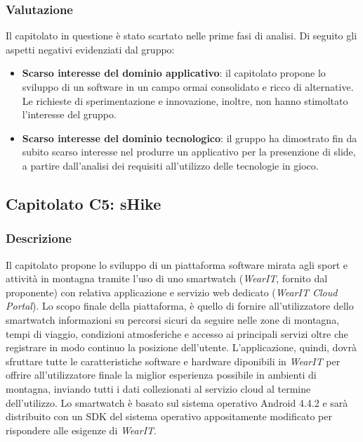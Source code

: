 \subsubsection{Valutazione}
Il capitolato in questione è stato scartato nelle prime fasi di analisi. Di seguito gli aspetti negativi evidenziati dal gruppo:
\begin{itemize}
\item \textbf{Scarso interesse del dominio applicativo}: il capitolato propone lo sviluppo di un software in un campo ormai consolidato e ricco di alternative. Le richieste di sperimentazione e innovazione, inoltre, non hanno stimoltato l'interesse del gruppo.
\item \textbf{Scarso interesse del dominio tecnologico}: il gruppo ha dimostrato fin da subito scarso interesse nel produrre un applicativo per la presenzione di slide, a partire dall'analisi dei requisiti all'utilizzo delle tecnologie in gioco.
\end{itemize}


\subsection{Capitolato C5: sHike}

\subsubsection{Descrizione}
Il capitolato propone lo sviluppo di un piattaforma software mirata agli sport e attività  in montagna tramite l'uso di uno smartwatch (\emph{WearIT}, fornito dal proponente) con relativa applicazione e servizio web dedicato (\emph{WearIT Cloud Portal}). Lo scopo finale della piattaforma, è quello di fornire all'utilizzatore dello smartwatch informazioni su percorsi sicuri da seguire nelle zone di montagna, tempi di viaggio, condizioni atmosferiche e accesso ai principali servizi oltre che registrare in modo continuo la posizione dell'utente. L'applicazione, quindi, dovrà sfruttare tutte le caratteristiche software e hardware diponibili in \emph{WearIT} per offrire all'utilizzatore finale la miglior esperienza possibile in ambienti di montagna, inviando tutti i dati collezionati al servizio cloud al termine dell'utilizzo.
Lo smartwatch è basato sul sistema operativo Android 4.4.2 e sarà distribuito con un SDK del sistema operativo appositamente modificato per rispondere alle esigenze di \emph{WearIT}.

